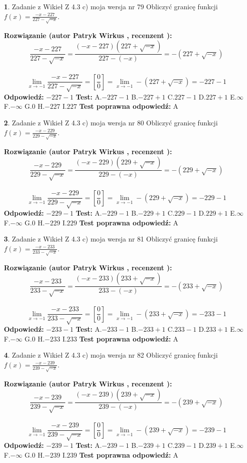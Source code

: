 \documentclass[12pt, a4paper]{article}
\theoremstyle{definition} %
\newtheorem{zad}{}
\newcommand{\zadStart}[1]{\begin{zad}#1\newline}
\newcommand{\zadStop}{\end{zad}}
\newcommand{\rozwStart}[2]{\noindent \textbf{Rozwiązanie (autor #1 , recenzent #2): }\newline}
\newcommand{\rozwStop}{\newline}
\newcommand{\odpStart}{\noindent \textbf{Odpowiedź:}\newline}
\newcommand{\odpStop}{\newline}
\newcommand{\testStart}{\noindent \textbf{Test:}\newline}
\newcommand{\testStop}{\newline}
\newcommand{\kluczStart}{\noindent \textbf{Test poprawna odpowiedź:}\newline}
\newcommand{\kluczStop}{\newline}
\begin{document}
\zadStart{Zadanie z Wikieł Z 4.3 c) moja wersja nr 79}
Obliczyć granicę funkcji $f(x)=\frac{-x-227}{227-\sqrt{-x}}$.
\zadStop
\rozwStart{Patryk Wirkus}{}
$$\frac{-x-227}{227-\sqrt{-x}}=\frac{(-x-227)(227+\sqrt{-x})}{227-(-x)}=-(227+\sqrt{-x})$$
\\
$$\lim\limits_{x\to-1}\frac{-x-227}{227-\sqrt{-x}}=[\frac{0}{0}]=\lim\limits_{x\to-1}-(227+\sqrt{-x}) =-227-1$$
\rozwStop
\odpStart
$-227-1$
\odpStop
\testStart
A.$-227-1$
B.$-227+1$
C.$227-1$
D.$227+1$
E.$\infty$
F.$-\infty$
G.$0$
H.$-227$
I.$227$
\testStop
\kluczStart
A
\kluczStop



\zadStart{Zadanie z Wikieł Z 4.3 c) moja wersja nr 80}
Obliczyć granicę funkcji $f(x)=\frac{-x-229}{229-\sqrt{-x}}$.
\zadStop
\rozwStart{Patryk Wirkus}{}
$$\frac{-x-229}{229-\sqrt{-x}}=\frac{(-x-229)(229+\sqrt{-x})}{229-(-x)}=-(229+\sqrt{-x})$$
\\
$$\lim\limits_{x\to-1}\frac{-x-229}{229-\sqrt{-x}}=[\frac{0}{0}]=\lim\limits_{x\to-1}-(229+\sqrt{-x}) =-229-1$$
\rozwStop
\odpStart
$-229-1$
\odpStop
\testStart
A.$-229-1$
B.$-229+1$
C.$229-1$
D.$229+1$
E.$\infty$
F.$-\infty$
G.$0$
H.$-229$
I.$229$
\testStop
\kluczStart
A
\kluczStop



\zadStart{Zadanie z Wikieł Z 4.3 c) moja wersja nr 81}
Obliczyć granicę funkcji $f(x)=\frac{-x-233}{233-\sqrt{-x}}$.
\zadStop
\rozwStart{Patryk Wirkus}{}
$$\frac{-x-233}{233-\sqrt{-x}}=\frac{(-x-233)(233+\sqrt{-x})}{233-(-x)}=-(233+\sqrt{-x})$$
\\
$$\lim\limits_{x\to-1}\frac{-x-233}{233-\sqrt{-x}}=[\frac{0}{0}]=\lim\limits_{x\to-1}-(233+\sqrt{-x}) =-233-1$$
\rozwStop
\odpStart
$-233-1$
\odpStop
\testStart
A.$-233-1$
B.$-233+1$
C.$233-1$
D.$233+1$
E.$\infty$
F.$-\infty$
G.$0$
H.$-233$
I.$233$
\testStop
\kluczStart
A
\kluczStop



\zadStart{Zadanie z Wikieł Z 4.3 c) moja wersja nr 82}
Obliczyć granicę funkcji $f(x)=\frac{-x-239}{239-\sqrt{-x}}$.
\zadStop
\rozwStart{Patryk Wirkus}{}
$$\frac{-x-239}{239-\sqrt{-x}}=\frac{(-x-239)(239+\sqrt{-x})}{239-(-x)}=-(239+\sqrt{-x})$$
\\
$$\lim\limits_{x\to-1}\frac{-x-239}{239-\sqrt{-x}}=[\frac{0}{0}]=\lim\limits_{x\to-1}-(239+\sqrt{-x}) =-239-1$$
\rozwStop
\odpStart
$-239-1$
\odpStop
\testStart
A.$-239-1$
B.$-239+1$
C.$239-1$
D.$239+1$
E.$\infty$
F.$-\infty$
G.$0$
H.$-239$
I.$239$
\testStop
\kluczStart
A
\kluczStop
\end{document}
